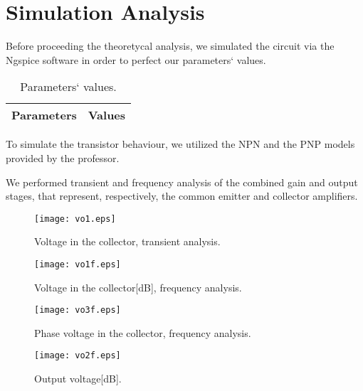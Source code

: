 \section{Simulation Analysis}
\label{sec:simulation}

\par Before proceeding the theoretycal analysis, we simulated the circuit via the Ngspice software in order to perfect our parameters` values.

\begin{table}[h]
  \centering
  \begin{tabular}{|l|r|}
    \hline    
    {\bf Parameters} & {\bf Values} \\ \hline
    
  \end{tabular}
  \caption{Parameters` values.}
  \label{tab:s01}
\end{table}

\par To simulate the transistor behaviour, we utilized the NPN and the PNP models provided by the professor.

\par We performed transient and frequency analysis of the combined gain and output stages, that represent, respectively, the common emitter and collector amplifiers.

\begin{figure}[h] \centering
\texttt{[image: vo1.eps]}
\caption{Voltage in the collector, transient analysis.}
\label{fig:s1}
\end{figure}


\begin{figure}[h] \centering
\texttt{[image: vo1f.eps]}
\caption{Voltage in the collector[dB], frequency analysis.}
\label{fig:s2}
\end{figure}

\vspace{10.0cm}

\begin{figure}[h] \centering
\texttt{[image: vo3f.eps]}
\caption{Phase voltage in the collector, frequency analysis.}
\label{fig:s3}
\end{figure}

\vspace{10.0cm}


\begin{figure}[h] \centering
\texttt{[image: vo2f.eps]}
\caption{Output voltage[dB].}
\label{fig:s4}
\end{figure}

